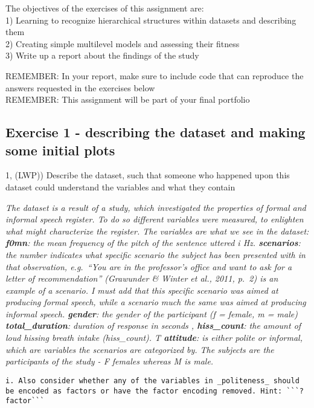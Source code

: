 \documentclass[
]{article}
\begin{document}
The objectives of the exercises of this assignment are:\\
1) Learning to recognize hierarchical structures within datasets and
describing them\\
2) Creating simple multilevel models and assessing their fitness\\
3) Write up a report about the findings of the study

REMEMBER: In your report, make sure to include code that can reproduce
the answers requested in the exercises below\\
REMEMBER: This assignment will be part of your final portfolio

\hypertarget{exercise-1---describing-the-dataset-and-making-some-initial-plots}{%
\subsection{Exercise 1 - describing the dataset and making some initial
plots}\label{exercise-1---describing-the-dataset-and-making-some-initial-plots}}

1, (LWP)) Describe the dataset, such that someone who happened upon this
dataset could understand the variables and what they contain

\emph{The dataset is a result of a study, which investigated the
properties of formal and informal speech register. To do so different
variables were measured, to enlighten what might characterize the
register. The variables are what we see in the dataset: \textbf{f0mn}:
the mean frequency of the pitch of the sentence uttered i Hz.
\textbf{scenarios}: the number indicates what specific scenario the
subject has been presented with in that observation, e.g.~``You are in
the professor's office and want to ask for a letter of recommendation''
(Grawunder \& Winter et al., 2011, p.~2) is an example of a scenario. I
must add that this specific scenario was aimed at producing formal
speech, while a scenario much the same was aimed at producing informal
speech. \textbf{gender}: the gender of the participant (f = female, m =
male) \textbf{total\_duration}: duration of response in seconds ,
\textbf{hiss\_count}: the amount of loud hissing breath intake
(hiss\_count). T \textbf{attitude}: is either polite or informal, which
are variables the scenarios are categorized by. The subjects are the
participants of the study - F females whereas M is male.}

\begin{verbatim}
i. Also consider whether any of the variables in _politeness_ should be encoded as factors or have the factor encoding removed. Hint: ```?factor```  
\end{verbatim}
\end{document}
